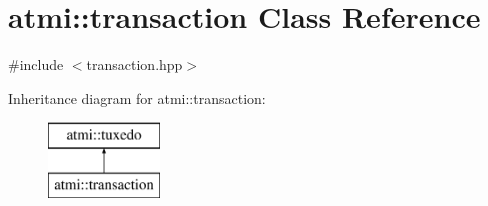 \hypertarget{classatmi_1_1transaction}{\section{atmi\+:\+:transaction Class Reference}
\label{classatmi_1_1transaction}
}


{\ttfamily \#include $<$transaction.\+hpp$>$}

Inheritance diagram for atmi\+:\+:transaction\+:\begin{figure}[H]
\begin{center}
\leavevmode
\includegraphics[height=2.000000cm]{classatmi_1_1transaction}
\end{center}
\end{figure}
